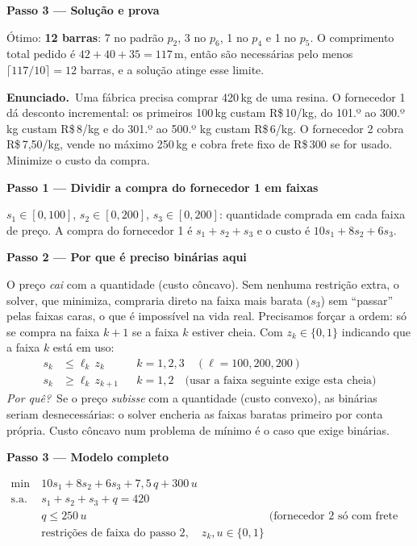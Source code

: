 \documentclass[11pt,a4paper]{article}
\newcommand{\enunciado}{\par\textbf{Enunciado.}\ }
\newcommand{\passo}[1]{\par\medskip\textbf{#1}\par}
\newcommand{\porque}{\textit{Por quê?}\ }
\begin{document}
\passo{Passo 3 --- Solução e prova}
Ótimo: \textbf{12 barras}: 7 no padrão $p_2$, 3 no $p_6$, 1 no $p_4$ e 1 no $p_5$. O comprimento total pedido é
$42+40+35=117$\,m, então são necessárias pelo menos $\lceil117/10\rceil=12$ barras, e a solução atinge esse limite.

\enunciado Uma fábrica precisa comprar 420\,kg de uma resina. O fornecedor 1 dá desconto incremental: os primeiros 100\,kg
custam R\$\,10/kg, do 101.º ao 300.º kg custam R\$\,8/kg e do 301.º ao 500.º kg custam R\$\,6/kg. O fornecedor 2 cobra
R\$\,7,50/kg, vende no máximo 250\,kg e cobra frete fixo de R\$\,300 se for usado. Minimize o custo da compra.

\passo{Passo 1 --- Dividir a compra do fornecedor 1 em faixas}
$s_1\in[0,100]$, $s_2\in[0,200]$, $s_3\in[0,200]$: quantidade comprada em cada faixa de preço. A compra do fornecedor 1 é
$s_1+s_2+s_3$ e o custo é $10s_1+8s_2+6s_3$.

\passo{Passo 2 --- Por que é preciso binárias aqui}
O preço \emph{cai} com a quantidade (custo côncavo). Sem nenhuma restrição extra, o solver, que minimiza, compraria direto na
faixa mais barata ($s_3$) sem ``passar'' pelas faixas caras, o que é impossível na vida real. Precisamos forçar a ordem:
só se compra na faixa $k+1$ se a faixa $k$ estiver cheia. Com $z_k\in\{0,1\}$ indicando que a faixa $k$ está em uso:
\begin{align*}
  s_k &\le \ell_k\,z_k && k=1,2,3 \quad(\ell = 100, 200, 200)\\
  s_k &\ge \ell_k\,z_{k+1} && k=1,2 \quad\text{(usar a faixa seguinte exige esta cheia)}
\end{align*}
\porque Se o preço \emph{subisse} com a quantidade (custo convexo), as binárias seriam desnecessárias: o solver encheria as
faixas baratas primeiro por conta própria. Custo côncavo num problema de mínimo é o caso que exige binárias.

\passo{Passo 3 --- Modelo completo}
\begin{align*}
  \min\ & 10s_1 + 8s_2 + 6s_3 + 7{,}5\,q + 300\,u\\
  \text{s.a.}\ & s_1 + s_2 + s_3 + q = 420\\
  & q \le 250\,u && \text{(fornecedor 2 só com frete pago)}\\
  & \text{restrições de faixa do passo 2}, \quad z_k, u\in\{0,1\}
\end{align*}
\end{document}
